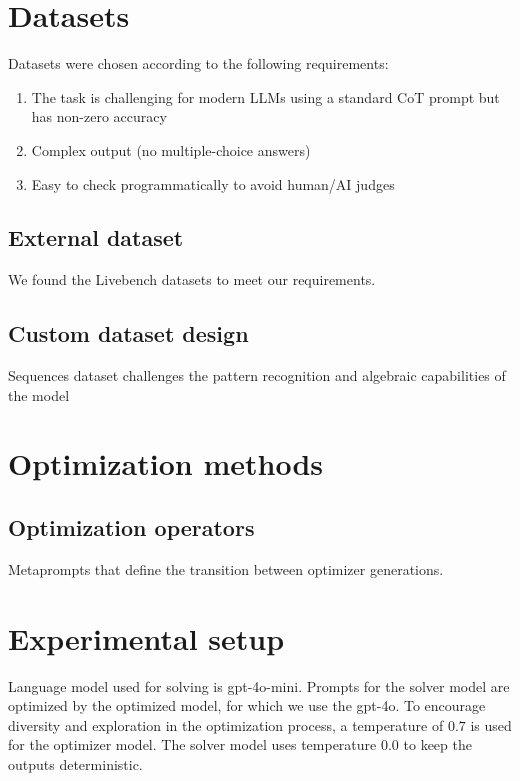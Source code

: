 \section{Datasets}
Datasets were chosen according to the following requirements:
\begin{enumerate}
    \item The task is challenging for modern LLMs using a standard CoT prompt but has non-zero accuracy
    \item Complex output (no multiple-choice answers)
    \item Easy to check programmatically to avoid human/AI judges
\end{enumerate} 
\subsection{External dataset}
We found the Livebench datasets to meet our requirements.
\subsection{Custom dataset design}
Sequences dataset challenges the pattern recognition and algebraic capabilities of the model 
\section{Optimization methods}
\subsection{Optimization operators}
Metaprompts that define the transition between optimizer generations.
\section{Experimental setup}
Language model used for solving is gpt-4o-mini. Prompts for the solver model are optimized by the optimized model, for which we use the gpt-4o.
To encourage diversity and exploration in the optimization process, a temperature of $0.7$ is used for the optimizer model. The solver model uses
temperature $0.0$ to keep the outputs deterministic. 